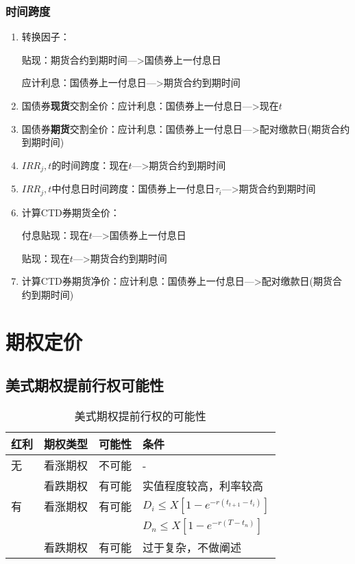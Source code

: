 \documentclass{article}
\begin{document}
\subsubsection{时间跨度}
\begin{enumerate}
    \item 转换因子：
    
    贴现：{\color{red}期货合约到期时间}--->{\color{Green}国债券上一付息日}
    
    应计利息：{\color{Green}国债券上一付息日}--->{\color{red}期货合约到期时间}
    \item 国债券\textbf{现货}交割全价：应计利息：{\color{Green}国债券上一付息日}--->{\color{blue}现在$t$}
    \item 国债券\textbf{期货}交割全价：应计利息：{\color{Green}国债券上一付息日}--->{\color{red}配对缴款日(期货合约到期时间)}
    \item $IRR_j,t$的时间跨度：{\color{blue}现在$t$}--->{\color{red}期货合约到期时间}
    \item $IRR_j,t$中付息日时间跨度：{\color{Green}国债券上一付息日$\tau_i$}--->{\color{red}期货合约到期时间}
    \item 计算CTD券期货全价：

    付息贴现：{\color{blue}现在$t$}--->{\color{Green}国债券上一付息日}

    贴现：{\color{blue}现在$t$}--->{\color{red}期货合约到期时间}
    \item 计算CTD券期货净价：应计利息：{\color{Green}国债券上一付息日}--->{\color{red}配对缴款日(期货合约到期时间)}
\end{enumerate}
\clearpage


\section{期权定价}
\subsection{美式期权提前行权可能性}
\setcounter{footnote}{1}
\begin{table}[htbp]
    \centering
    \caption{美式期权提前行权的可能性}
    \label{tab:my-table}
    \begin{tabular}{@{}llll@{}}
        \toprule
        红利     & 期权类型   & 可能性 & 条件                                           \\ \midrule
        无       & 看涨期权   & 不可能 &  -                                             \\
                & 看跌期权   & 有可能 & 实值程度较高\footnotemark[\value{footnote}]，利率较高                                               \\ \cmidrule(l){1-4} 
        有       & 看涨期权   & 有可能 & $D_i \leq X[1-e^{-r(t_{t+1}-t_i)}]$           \\
                &            &        & $D_n \leq X[1-e^{-r(T-t_n)}]$                 \\ 
                & 看跌期权   & 有可能 &  过于复杂，不做阐述                                        \\ \bottomrule
    \end{tabular}
\end{table}
\end{document}
